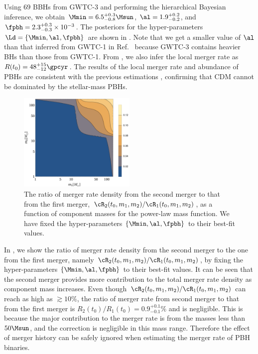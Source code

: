 \documentclass[
reprint,           %
superscriptaddress,%
amsmath,           %
amssymb,           %
aps,               %
prd,               %
notitlepage,       %
longbibliography,  %
floatfix,          %
nofootinbib,
]{revtex4-1}
\begin{document}
Using $69$ BBHs from GWTC-3 and performing the hierarchical Bayesian inference, we obtain $\Mmin = 6.5^{+0.3}_{-0.8} \Msun$, $\al = 1.9^{+0.2}_{-0.2}$, and $\fpbh = 2.3^{+0.3}_{-0.3} \times 10^{-3}$. The posteriors for the hyper-parameters $\Ld = \{\Mmin, \al, \fpbh\}$ are shown in . Note that we get a smaller value of $\al$ than that inferred from GWTC-1 in Ref.~\cite{Wu:2020drm} because GWTC-3 contains heavier BHs than those from GWTC-1. From , we also infer the local merger rate as $R(t_0) = 48^{+15}_{-12} \gpcyr$. The results of the local merger rate and abundance of PBHs are consistent with the previous estimations \cite{Sasaki:2016jop,Ali-Haimoud:2017rtz,Chen:2018czv,Chen:2018rzo,Chen:2019irf,Wu:2020drm,Chen:2021nxo,Chen:2022fda,Zheng:2022wqo}, confirming that CDM cannot be dominated by the stellar-mass PBHs.

\begin{figure}[htbp!]
	\centering
	\includegraphics[width=0.5\textwidth]{ratio-power.pdf}
	\caption{\label{ratio-power}The ratio of merger rate density from the second merger to that from the first merger, $\cR_2(t_0, m_1, m_2)/\cR_1(t_0, m_1, m_2)$, as a function of component masses for the power-law mass function. We have fixed the hyper-parameters $\{\Mmin, \al, \fpbh\}$ to their best-fit values.}
\end{figure}

In , we show the ratio of merger rate density from the second merger to the one from the first merger, namely $\cR_2(t_0, m_1, m_2)/\cR_1(t_0, m_1, m_2)$, by fixing the hyper-parameters $\{\Mmin, \al, \fpbh\}$ to their best-fit values. It can be seen that the second merger provides more contribution to the total merger rate density as component mass increases. Even though $\cR_2(t_0, m_1, m_2)/\cR_1(t_0, m_1, m_2)$ can reach as high as $\gtrsim 10\%$, the ratio of merger rate from second merger to that from the first merger is $R_2(t_0)/R_1(t_0) = 0.9^{+0.1}_{-0.1}\%$ and is negligible. This is because the major contribution to the merger rate is from the masses less than $50\Msun$, and the correction is negligible in this mass range. Therefore the effect of merger history can be safely ignored when estimating the merger rate of PBH binaries.
\end{document}
